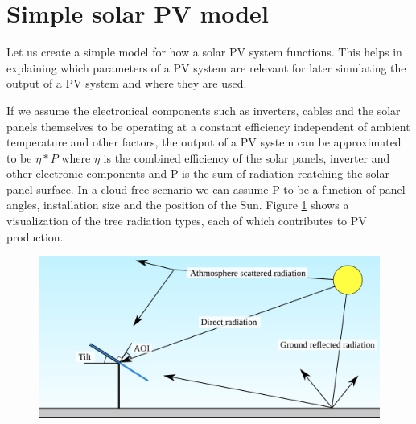 

\clearpage

\section{Simple solar PV model} \label{section_simple_pv_model}
Let us create a simple model for how a solar PV system functions. This helps in explaining which parameters of a PV system are relevant for later simulating the output of a PV system and where they are used.

If we assume the electronical components such as inverters, cables and the solar panels themselves to be operating at a constant efficiency independent of ambient temperature and other factors, the output of a PV system can be approximated to be $\eta * P$ where $\eta$ is the combined efficiency of the solar panels, inverter and other electronic components and P is the sum of radiation reatching the solar panel surface. In a cloud free scenario we can assume P to be a function of panel angles, installation size and the position of the Sun. Figure \ref{fig_simplediagram} shows a visualization of the tree radiation types, each of which contributes to PV production.

\begin{figure}[h]
\centering
\includegraphics[width=0.8\linewidth]{pics/pvmodel2}
\label{fig_simplediagram}
\end{figure}

